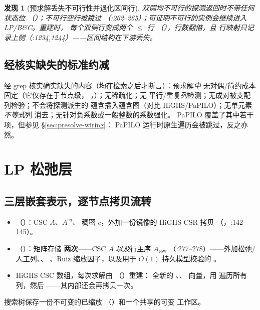 \documentclass[11pt]{ctexart}
\newtheorem{finding}{发现}
\begin{document}
\begin{finding}[预求解丢失不可行性并退化区间行]
双侧均不可行的探测返回时不带任何状态位
（）；不可行空行被跳过
（:262--265）；可证明不可行的实例会继续进入 LP/B\&C。重建时，
每个双侧行变成\emph{两个} $\le$ 行
（），行数翻倍，且
行映射只记录上侧（:1234,1244）——区间结构在下游丢失。
\end{finding}

\subsection{经核实缺失的标准约减}
经 grep 核实确实缺失的内容（均在检索之后才断言）：预求解\emph{中}
无对偶/简约成本固定（它仅存在于节点级，
，）；无稀疏化；无
平行/重复\emph{列}检测；无成对被支配列检验；不会将探测派生的
蕴含插入蕴含图（对比 HiGHS/PaPILO）；无单元素\emph{不等式}列
消去；无针对负系数或一般整数的系数强化。
PaPILO 覆盖了其中若干项，但参见 \S\ref{sec:presolve-wiring}：
PaPILO 运行时原生遍历会被跳过，反之亦然。

\section{LP 松弛层}

\subsection{三层嵌套表示，逐节点拷贝流转}
\label{sec:lp-representations}
\begin{itemize}[nosep]
\item {}（）：CSC $A$、$A^{eq}$、
  稠密 $c$，外加一份镜像的 HiGHS CSR 拷贝
  （，:142--145）。
\item {}（）：矩阵存储
  \textbf{两次}——CSC $A$ \emph{以及}行主序 $A_{\mathrm{row}}$
  （:277--278）——外加松弛/人工列、、
  、Ruiz 缩放因子，以及用于 $O(1)$
  持久模型校验的 。
\item HiGHS CSC 数组，每次求解由
  （）重建：
  全新的 、、
   向量，用  遍历所有
  列，然后 ——其内部还会再拷贝一次。
\end{itemize}
搜索树保存一份不可变的已缩放 
（）和一个共享的可变  工作区。
\end{document}
